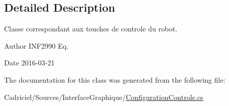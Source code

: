 \subsection{Detailed Description}
Classe correspondant aux touches de controle du robot. 

\begin{DoxyAuthor}{Author}
I\+N\+F2990 Eq. 
\end{DoxyAuthor}
\begin{DoxyDate}{Date}
2016-\/03-\/21 
\end{DoxyDate}


The documentation for this class was generated from the following file\+:\begin{DoxyCompactItemize}
\item 
Cadriciel/\+Sources/\+Interface\+Graphique/\hyperlink{_configuration_controle_8cs}{Configuration\+Controle.\+cs}\end{DoxyCompactItemize}
